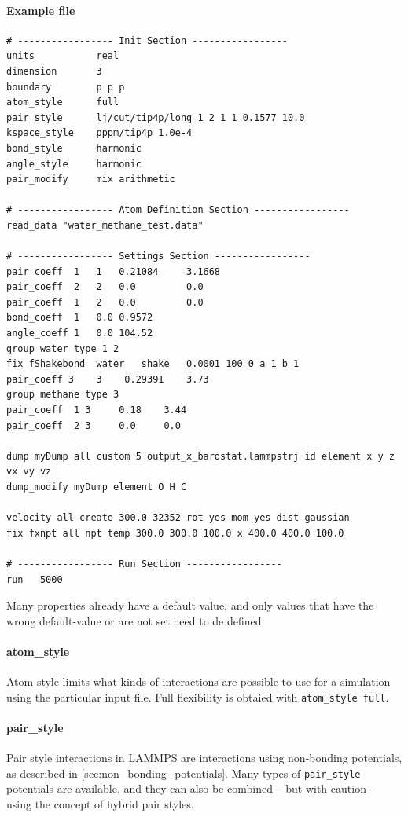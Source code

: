 \paragraph{Example file}

\begin{lstlisting}[language=LammpsInput]
# ----------------- Init Section -----------------
units 			real
dimension 		3
boundary		p p p 
atom_style		full
pair_style		lj/cut/tip4p/long 1 2 1 1 0.1577 10.0
kspace_style	pppm/tip4p 1.0e-4
bond_style 		harmonic
angle_style		harmonic
pair_modify		mix arithmetic

# ----------------- Atom Definition Section -----------------
read_data "water_methane_test.data"

# ----------------- Settings Section -----------------
pair_coeff	1 	1 	0.21084 	3.1668
pair_coeff	2 	2	0.0 		0.0
pair_coeff	1 	2 	0.0 		0.0
bond_coeff  1 	0.0 0.9572
angle_coeff 1 	0.0 104.52
group water type 1 2
fix	fShakebond	water 	shake 	0.0001 100 0 a 1 b 1
pair_coeff 3 	3 	 0.29391 	3.73
group methane type 3
pair_coeff 	1 3 	0.18 	3.44
pair_coeff 	2 3 	0.0 	0.0

dump myDump all custom 5 output_x_barostat.lammpstrj id element x y z vx vy vz
dump_modify myDump element O H C

velocity all create 300.0 32352 rot yes mom yes dist gaussian
fix fxnpt all npt temp 300.0 300.0 100.0 x 400.0 400.0 100.0

# ----------------- Run Section -----------------
run   5000
\end{lstlisting}

Many properties already have a default value, and only values that have the wrong default-value or are not set need to de defined.

\paragraph{atom\_style}
Atom style limits what kinds of interactions are possible to use for a simulation using the particular input file. Full flexibility is obtaied with {\tt atom\_style full}.

\paragraph{pair\_style}
Pair style interactions in LAMMPS are interactions using non-bonding potentials, as described in \ref{sec:non_bonding_potentials}. Many types of {\tt pair\_style} potentials are available, and they can also be combined -- but with caution -- using the concept of hybrid pair styles.

